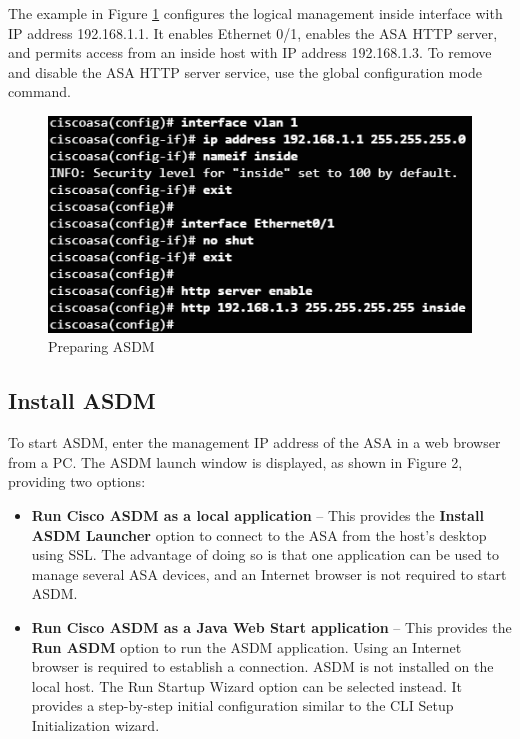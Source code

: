 The example in Figure \ref{PrepareASA} configures the logical management inside interface with IP address 192.168.1.1. It enables Ethernet 0/1, enables the ASA HTTP server, and permits access from an inside host with IP address 192.168.1.3. To remove and disable the ASA HTTP server service, use the  global configuration mode command.

\begin{figure}[hbtp]
\caption{Preparing ASDM}\label{PrepareASA}
\centering
\includegraphics[scale=1]{pictures/PrepareASA.PNG}
\end{figure}

\subsection{Install ASDM}

To start ASDM, enter the management IP address of the ASA in a web browser from a PC. The ASDM launch window is displayed, as shown in Figure 2, providing two options:

\begin{itemize}
\item \textbf{Run Cisco ASDM as a local application} -- This provides the \textbf{Install ASDM Launcher} option to connect to the ASA from the host’s desktop using SSL. The advantage of doing so is that one application can be used to manage several ASA devices, and an Internet browser is not required to start ASDM.
\item \textbf{Run Cisco ASDM as a Java Web Start application} -- This provides the \textbf{Run ASDM} option to run the ASDM application. Using an Internet browser is required to establish a connection. ASDM is not installed on the local host. The Run Startup Wizard option can be selected instead. It provides a step-by-step initial configuration similar to the CLI Setup Initialization wizard.
\end{itemize}

